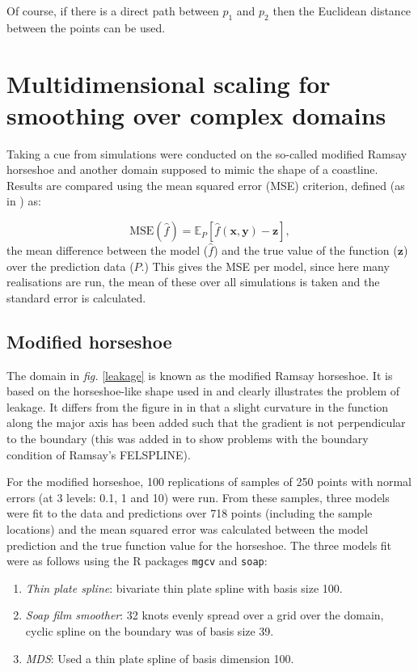 \documentclass[a4paper,10pt]{article}
\newcommand{\fig}[1]{\emph{fig.} \ref{#1}}
\begin{document}
Of course, if there is a direct path between $p_1$ and $p_2$ then the Euclidean distance between the points can be used.

\section{Multidimensional scaling for smoothing over complex domains}

Taking a cue from \cite{soap} simulations were conducted on the so-called modified Ramsay horseshoe and another domain supposed to mimic the shape of a coastline. Results are compared using the mean squared error (MSE) criterion, defined (as in \cite{elements}) as:

\begin{equation}
\text{MSE}(\hat{f}) = \mathbb{E}_P [\hat{f}(\mathbf{x,y}) - \mathbf{z}],
\end{equation}
the mean difference between the model ($\hat{f}$) and the true value of the function ($\mathbf{z}$) over the prediction data ($P$.) This gives the MSE per model, since here many realisations are run, the mean of these over all simulations is taken and the standard error is calculated.

\subsection{Modified horseshoe}

The domain in \fig{leakage} is known as the modified Ramsay horseshoe. It is based on the horseshoe-like shape used in \cite{ramsay} and clearly illustrates the problem of leakage. It differs from the figure in \cite{ramsay} in that a slight curvature in the function along the major axis has been added such that the gradient is not perpendicular to the boundary (this was added in \cite{soap} to show problems with the boundary condition of Ramsay's FELSPLINE).

For the modified horseshoe, 100 replications of samples of 250 points with normal errors (at 3 levels: 0.1, 1 and 10) were run. From these samples, three models were fit to the data and predictions over 718 points (including the sample locations) and the mean squared error was calculated between the model prediction and the true function value for the horseshoe. The three models fit were as follows using the \textsf{R} packages \texttt{mgcv} and \texttt{soap}:

\begin{enumerate}
\item \emph{Thin plate spline}: bivariate thin plate spline with basis size 100.
\item \emph{Soap film smoother}: 32 knots evenly spread over a grid over the domain, cyclic spline on the boundary was of basis size 39.
\item \emph{MDS}: Used a thin plate spline of basis dimension 100.
\end{enumerate} 
\end{document}
